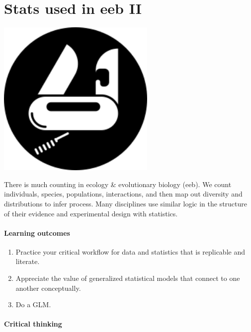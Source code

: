 \documentclass[
]{book}
\providecommand{\tightlist}{%
  \setlength{\itemsep}{0pt}\setlength{\parskip}{0pt}}
\begin{document}
\hypertarget{eebII}{%
\chapter{Stats used in eeb II}\label{eebII}}

\includegraphics[width=3in,height=\textheight]{./eebII.png}

There is much counting in ecology \& evolutionary biology (eeb). We count individuals, species, populations, interactions, and then map out diversity and distributions to infer process. Many disciplines use similar logic in the structure of their evidence and experimental design with statistics.

\hypertarget{learning-outcomes-4}{%
\subsubsection*{Learning outcomes}\label{learning-outcomes-4}}

\begin{enumerate}
\def\labelenumi{\arabic{enumi}.}
\tightlist
\item
  Practice your critical workflow for data and statistics that is replicable and literate.\\
\item
  Appreciate the value of generalized statistical models that connect to one another conceptually.\\
\item
  Do a GLM.
\end{enumerate}

\hypertarget{critical-thinking-3}{%
\subsubsection*{Critical thinking}\label{critical-thinking-3}}
\end{document}
